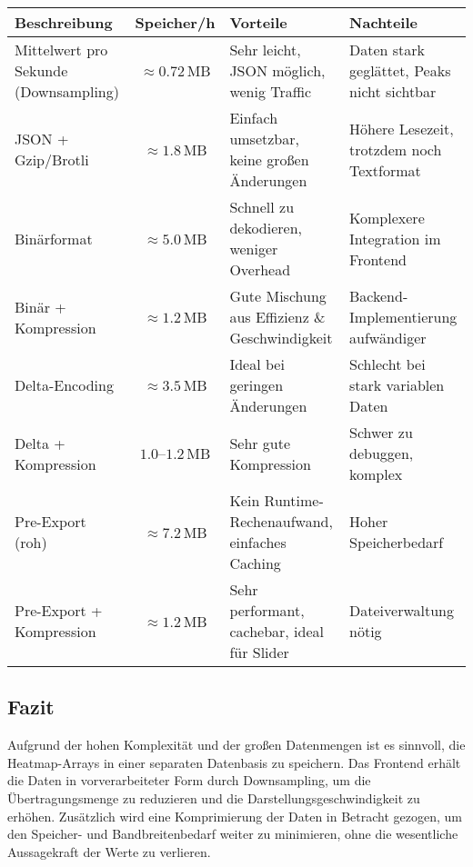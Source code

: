\begin{center}
\begin{adjustbox}{max width=\textwidth}
\begin{tabular}{|l|c|p{5cm}|p{5cm}|}
\hline
\textbf{Beschreibung} & \textbf{Speicher/h} & \textbf{Vorteile} & \textbf{Nachteile} \\ \hline
Mittelwert pro Sekunde (Downsampling) & $\approx 0.72$\,MB & Sehr leicht, JSON möglich, wenig Traffic & Daten stark geglättet, Peaks nicht sichtbar \\ \hline
JSON + Gzip/Brotli & $\approx 1.8$\,MB & Einfach umsetzbar, keine großen Änderungen & Höhere Lesezeit, trotzdem noch Textformat \\ \hline
Binärformat & $\approx 5.0$\,MB & Schnell zu dekodieren, weniger Overhead & Komplexere Integration im Frontend \\ \hline
Binär + Kompression & $\approx 1.2$\,MB & Gute Mischung aus Effizienz \& Geschwindigkeit & Backend-Implementierung aufwändiger \\ \hline
Delta-Encoding & $\approx 3.5$\,MB & Ideal bei geringen Änderungen & Schlecht bei stark variablen Daten \\ \hline
Delta + Kompression & $1.0$–$1.2$\,MB & Sehr gute Kompression & Schwer zu debuggen, komplex \\ \hline
Pre-Export (roh) & $\approx 7.2$\,MB & Kein Runtime-Rechenaufwand, einfaches Caching & Hoher Speicherbedarf \\ \hline
Pre-Export + Kompression & $\approx 1.2$\,MB & Sehr performant, cachebar, ideal für Slider & Dateiverwaltung nötig \\ \hline
\end{tabular}
\end{adjustbox}
\end{center}

\subsection*{Fazit}
Aufgrund der hohen Komplexität und der großen Datenmengen ist es sinnvoll, die Heatmap-Arrays in einer separaten Datenbasis zu speichern. 
Das Frontend erhält die Daten in vorverarbeiteter Form durch Downsampling, um die Übertragungsmenge zu reduzieren und die Darstellungsgeschwindigkeit zu erhöhen. 
Zusätzlich wird eine Komprimierung der Daten in Betracht gezogen, um den Speicher- und Bandbreitenbedarf weiter zu minimieren, ohne die wesentliche Aussagekraft der Werte zu verlieren.
